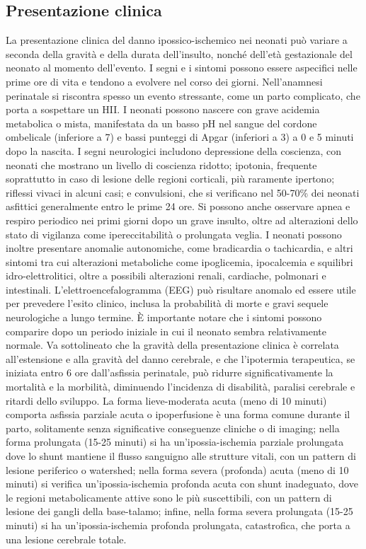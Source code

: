 \subsection{Presentazione clinica}
La presentazione clinica del danno ipossico-ischemico nei neonati può variare a seconda della gravità e della durata dell'insulto, nonché dell'età gestazionale del neonato al momento dell'evento. I segni e i sintomi possono essere aspecifici nelle prime ore di vita e tendono a evolvere nel corso dei giorni.
Nell'anamnesi perinatale si riscontra spesso un evento stressante, come un parto complicato, che porta a sospettare un HII. I neonati possono nascere con grave acidemia metabolica o mista, manifestata da un basso pH nel sangue del cordone ombelicale (inferiore a 7) e bassi punteggi di Apgar (inferiori a 3) a 0 e 5 minuti dopo la nascita. I segni neurologici includono depressione della coscienza, con neonati che mostrano un livello di coscienza ridotto; ipotonia, frequente soprattutto in caso di lesione delle regioni corticali, più raramente ipertono; riflessi vivaci in alcuni casi; e convulsioni, che si verificano nel 50-70\% dei neonati asfittici generalmente entro le prime 24 ore. Si possono anche osservare apnea e respiro periodico nei primi giorni dopo un grave insulto, oltre ad alterazioni dello stato di vigilanza come ipereccitabilità o prolungata veglia. 
I neonati possono inoltre presentare anomalie autonomiche, come bradicardia o tachicardia, e altri sintomi tra cui alterazioni metaboliche come ipoglicemia, ipocalcemia e squilibri idro-elettrolitici, oltre a possibili alterazioni renali, cardiache, polmonari e intestinali. L'elettroencefalogramma (EEG) può risultare anomalo ed essere utile per prevedere l'esito clinico, inclusa la probabilità di morte e gravi sequele neurologiche a lungo termine. È importante notare che i sintomi possono comparire dopo un periodo iniziale in cui il neonato sembra relativamente normale. 
Va sottolineato che la gravità della presentazione clinica è correlata all'estensione e alla gravità del danno cerebrale, e che l'ipotermia terapeutica, se iniziata entro 6 ore dall'asfissia perinatale, può ridurre significativamente la mortalità e la morbilità, diminuendo l'incidenza di disabilità, paralisi cerebrale e ritardi dello sviluppo.
La forma lieve-moderata acuta (meno di 10 minuti) comporta asfissia parziale acuta o ipoperfusione è una forma comune durante il parto, solitamente senza significative conseguenze cliniche o di imaging; nella forma prolungata (15-25 minuti) si ha un'ipossia-ischemia parziale prolungata dove lo shunt mantiene il flusso sanguigno alle strutture vitali, con un pattern di lesione periferico o watershed; nella forma severa (profonda) acuta (meno di 10 minuti) si verifica un'ipossia-ischemia profonda acuta con shunt inadeguato, dove le regioni metabolicamente attive sono le più suscettibili, con un pattern di lesione dei gangli della base-talamo; infine, nella forma severa prolungata (15-25 minuti) si ha un'ipossia-ischemia profonda prolungata, catastrofica, che porta a una lesione cerebrale totale.

